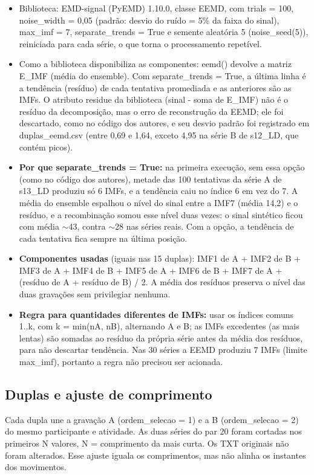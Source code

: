 \begin{itemize}
    \item Biblioteca: EMD-signal (PyEMD) 1.10.0, classe EEMD, com trials = 100, noise\_width = 0,05 (padrão: desvio do ruído = 5\% da faixa do sinal), max\_imf = 7, separate\_trends = True e semente aleatória 5 (noise\_seed(5)), reiniciada para cada série, o que torna o processamento repetível.
    \item Como a biblioteca disponibiliza as componentes: eemd() devolve a matriz E\_IMF (média do ensemble). Com separate\_trends = True, a última linha é a tendência (resíduo) de cada tentativa promediada e as anteriores são as IMFs. O atributo residue da biblioteca (sinal - soma de E\_IMF) não é o resíduo da decomposição, mas o erro de reconstrução da EEMD; ele foi descartado, como no código dos autores, e seu desvio padrão foi registrado em duplas\_eemd.csv (entre 0,69 e 1,64, exceto 4,95 na série B de s12\_LD, que contém picos).
    \item \textbf{Por que separate\_trends = True:} na primeira execução, sem essa opção (como no código dos autores), metade das 100 tentativas da série A de s13\_LD produziu só 6 IMFs, e a tendência caiu no índice 6 em vez do 7. A média do ensemble espalhou o nível do sinal entre a IMF7 (média 14,2) e o resíduo, e a recombinação somou esse nível duas vezes: o sinal sintético ficou com média $\sim$43, contra $\sim$28 nas séries reais. Com a opção, a tendência de cada tentativa fica sempre na última posição.
    \item \textbf{Componentes usadas} (iguais nas 15 duplas): IMF1 de A + IMF2 de B + IMF3 de A + IMF4 de B + IMF5 de A + IMF6 de B + IMF7 de A + (resíduo de A + resíduo de B) / 2. A média dos resíduos preserva o nível das duas gravações sem privilegiar nenhuma.
    \item \textbf{Regra para quantidades diferentes de IMFs:} usar os índices comuns 1..k, com k = min(nA, nB), alternando A e B; as IMFs excedentes (as mais lentas) são somadas ao resíduo da própria série antes da média dos resíduos, para não descartar tendência. Nas 30 séries a EEMD produziu 7 IMFs (limite max\_imf), portanto a regra não precisou ser acionada.
\end{itemize}
\subsection{Duplas e ajuste de comprimento}

Cada dupla une a gravação A (ordem\_selecao = 1) e a B (ordem\_selecao = 2) do mesmo participante e atividade. As duas séries do par 20 foram cortadas nos primeiros N valores, N = comprimento da mais curta. Os TXT originais não foram alterados. Esse ajuste iguala os comprimentos, mas não alinha os instantes dos movimentos.


